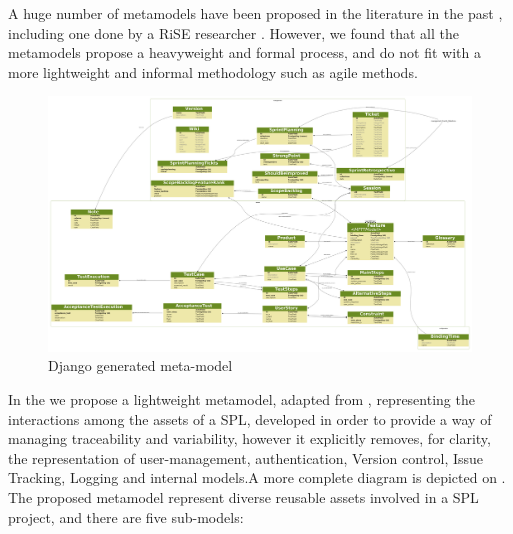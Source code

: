 A huge number of metamodels have been proposed in the literature in the past \citep{Schubanz2013, Araujo2013, Anquetil2010, Bayer2001, Buhne2005, Seidl2012}, including one done by a \ac{RiSE} researcher \citep{Cavalcanti:2011}. However, we found that all the metamodels propose a heavyweight and formal process, and do not fit with a more lightweight and informal methodology such as agile methods.

\begin{figure}[htp]
\centering
\includegraphics[width=23cm, angle=90]{chapters/proposed_solution/img/full_diagram.png}
  \caption[Django generated UML]{Django generated meta-model}
\label{fg:output}
\end{figure}
In the  we propose a lightweight metamodel, adapted from \citet{Cavalcanti:2011}, representing the interactions among the assets of a SPL, developed in order to provide a way of managing traceability and variability, however it explicitly removes, for clarity, the representation of user-management, authentication, Version control, Issue Tracking,  Logging and internal models.A more complete diagram is depicted on . The proposed metamodel represent diverse reusable assets involved in a SPL project, and there are five sub-models:

